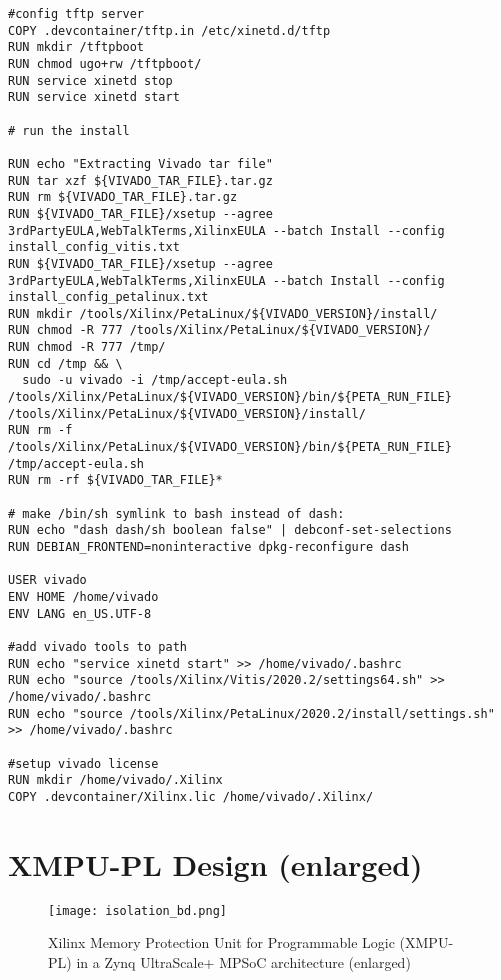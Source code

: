 \begin{lstlisting}[language=docker, breaklines=true, caption={Dockerfile for EDF Development Container}, label=lst:Dockerfile]
#config tftp server
COPY .devcontainer/tftp.in /etc/xinetd.d/tftp
RUN mkdir /tftpboot
RUN chmod ugo+rw /tftpboot/
RUN service xinetd stop
RUN service xinetd start

# run the install

RUN echo "Extracting Vivado tar file" 
RUN tar xzf ${VIVADO_TAR_FILE}.tar.gz 
RUN rm ${VIVADO_TAR_FILE}.tar.gz
RUN ${VIVADO_TAR_FILE}/xsetup --agree 3rdPartyEULA,WebTalkTerms,XilinxEULA --batch Install --config install_config_vitis.txt 
RUN ${VIVADO_TAR_FILE}/xsetup --agree 3rdPartyEULA,WebTalkTerms,XilinxEULA --batch Install --config install_config_petalinux.txt
RUN mkdir /tools/Xilinx/PetaLinux/${VIVADO_VERSION}/install/
RUN chmod -R 777 /tools/Xilinx/PetaLinux/${VIVADO_VERSION}/
RUN chmod -R 777 /tmp/
RUN cd /tmp && \
  sudo -u vivado -i /tmp/accept-eula.sh /tools/Xilinx/PetaLinux/${VIVADO_VERSION}/bin/${PETA_RUN_FILE} /tools/Xilinx/PetaLinux/${VIVADO_VERSION}/install/
RUN rm -f /tools/Xilinx/PetaLinux/${VIVADO_VERSION}/bin/${PETA_RUN_FILE} /tmp/accept-eula.sh
RUN rm -rf ${VIVADO_TAR_FILE}*

# make /bin/sh symlink to bash instead of dash:
RUN echo "dash dash/sh boolean false" | debconf-set-selections
RUN DEBIAN_FRONTEND=noninteractive dpkg-reconfigure dash

USER vivado
ENV HOME /home/vivado
ENV LANG en_US.UTF-8

#add vivado tools to path
RUN echo "service xinetd start" >> /home/vivado/.bashrc
RUN echo "source /tools/Xilinx/Vitis/2020.2/settings64.sh" >> /home/vivado/.bashrc
RUN echo "source /tools/Xilinx/PetaLinux/2020.2/install/settings.sh" >> /home/vivado/.bashrc

#setup vivado license
RUN mkdir /home/vivado/.Xilinx
COPY .devcontainer/Xilinx.lic /home/vivado/.Xilinx/
\end{lstlisting}


\chapter{XMPU-PL Design (enlarged)}\label{apx:xmpu-pl-design-enlarged}
\begin{figure}
  \centering
    \texttt{[image: isolation\_bd.png]}
    \caption [Proposed XMPU-PL Design (enlarged)]{Xilinx Memory Protection Unit for Programmable Logic (XMPU-PL) in a Zynq UltraScale+ MPSoC architecture (enlarged)}
    \label{fig:XMPU-PLDesign_large}
\end{figure}